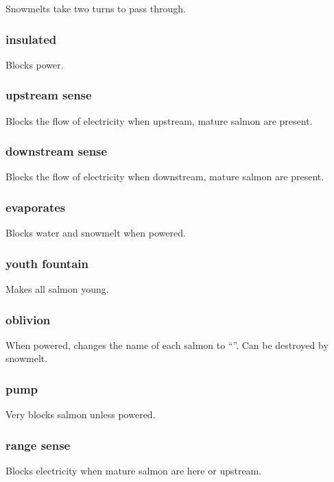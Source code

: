 \documentclass[10pt]{article}
\begin{document}
Snowmelts take two turns to pass through.

\subsubsection{insulated}

Blocks power.

\subsubsection{upstream sense}

Blocks the flow of electricity when upstream, mature salmon are present.

\subsubsection{downstream sense}

Blocks the flow of electricity when downstream, mature salmon are present.

\subsubsection{evaporates}

Blocks water and snowmelt when powered.

\subsubsection{youth fountain}

Makes all salmon young.

\subsubsection{oblivion}

When powered, changes the name of each salmon to ``''. Can be destroyed by snowmelt.

\subsubsection{pump}

Very blocks salmon unless powered.

\subsubsection{range sense}

Blocks electricity when mature salmon are here or upstream.
\end{document}

